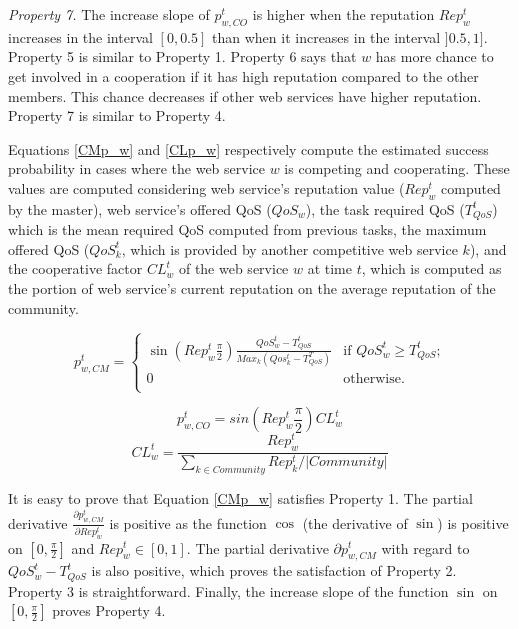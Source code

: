 \documentclass[fleqn]{singlecol-new}
\begin{document}
\noindent\textit{Property 7.}
The increase slope of $p_{w,CO}^t$ is higher when the reputation
$Rep^t_w$ increases in the interval $[0, 0.5]$ than when it
increases in the interval $]0.5, 1]$.
\\

\noindent Property 5 is similar to Property 1. Property 6 says
that $w$ has more chance to get involved in a cooperation if it
has high reputation compared to the other members. This chance
decreases if other web services have higher reputation. Property 7
is similar to Property 4.

Equations  \ref{CMp_w} and \ref{CLp_w} respectively compute the
estimated success probability in cases where the web service $w$
is competing and cooperating. These values are computed
considering web service's reputation value ($Rep^t_w$ computed by
the master), web service's offered QoS ($QoS_w$), the task
required QoS ($T_{QoS}^t$) which is the mean required QoS computed
from previous tasks, the maximum offered QoS ($QoS_k^t$, which is
provided by another competitive web service $k$), and the
cooperative factor $CL_w^t$ of the web service $w$ at time $t$,
which is computed as the portion of web service's current
reputation on the average reputation of the community.

\begin{equation} \label{CMp_w}
p_{w,CM}^t = \begin{cases}
\sin(Rep^t_w\frac{\pi}{2})\frac{QoS_w^t-T_{QoS}^t}{Max_k(Qos_k^t-T_{QoS}^T)} & \text{if $QoS_w^t\geq T_{QoS}^t$;}\\
0 & \text{otherwise.}\\
\end{cases}
\end{equation}

\begin{equation}\label{CLp_w}
p_{w,CO}^t=sin(Rep^t_w\frac{\pi}{2})CL_w^t
\end{equation}
\begin{equation*}
CL_w^t=\frac{Rep^t_w}{\sum_{k\in Community}Rep^t_k/|Community|}
\end{equation*}



It is easy to prove that Equation  \ref{CMp_w} satisfies Property
1. The partial derivative $\frac{\partial p_{w,CM}^t}{\partial
Rep^t_w}$ is positive as the function $\cos$ (the derivative of
$\sin$) is positive on $[0, \frac{\pi}{2}]$ and $Rep^t_w \in [0,
1]$. The partial derivative $\partial p_{w,CM}^t$ with regard to
$QoS_w^t - T_{QoS}^t$ is also positive, which proves the
satisfaction of Property 2. Property 3 is straightforward.
Finally, the increase slope of the function $\sin$ on $[0,
\frac{\pi}{2}]$ proves Property 4.
\end{document}
